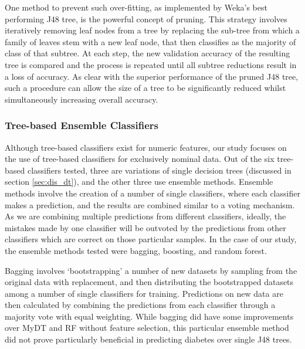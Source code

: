One method to prevent such over-fitting, as implemented by Weka's best performing J48 tree, is the powerful concept of pruning. This strategy involves iteratively removing leaf nodes from a tree by replacing the sub-tree from which a family of leaves stem with a new leaf node, that then classifies as the majority of class of that subtree. At each step, the new validation accuracy of the resulting tree is compared and the process is repeated until all subtree reductions result in a loss of accuracy. As clear with the superior performance of the pruned J48 tree, such a procedure can allow the size of a tree to be significantly reduced whilst simultaneously increasing overall accuracy.


\subsubsection{Tree-based Ensemble Classifiers}


Although tree-based classifiers exist for numeric features, our study focuses on the use of tree-based classifiers for exclusively nominal data. Out of the six tree-based classifiers tested, three are variations of single decision trees (discussed in section \ref{sec:dis_dt}), and the other three use ensemble methods. Ensemble methods involve the creation of a number of single classifiers, where each classifier makes a prediction, and the results are combined similar to a voting mechanism. As we are combining multiple predictions from different classifiers, ideally, the mistakes made by one classifier will be outvoted by the predictions from other classifiers which are correct on those particular samples. In the case of our study, the ensemble methods tested were bagging, boosting, and random forest.

Bagging involves `bootstrapping' a number of new datasets by sampling from the original data with replacement, and then distributing the bootstrapped datasets among a number of single classifiers for training. Predictions on new data are then calculated by combining the predictions from each classifier through a majority vote with equal weighting. While bagging did have some improvements over MyDT and RF without feature selection, this particular ensemble method did not prove particularly beneficial in predicting diabetes over single J48 trees.

